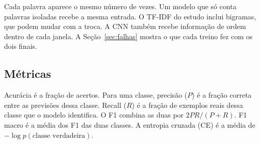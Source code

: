 Cada palavra aparece o mesmo número de vezes. Um modelo que só conta palavras
isoladas recebe a mesma entrada. O TF-IDF do estudo inclui bigramas, que podem
mudar com a troca. A CNN também recebe informação de ordem dentro de cada
janela. A Seção~\ref{sec:falhas} mostra o que cada treino fez com os dois finais.

\subsection{Métricas}
Acurácia é a fração de acertos. Para uma classe, precisão (\(P\)) é a fração
correta entre as previsões dessa classe. Recall (\(R\)) é a fração de exemplos
reais dessa classe que o modelo identifica. O F1 combina as duas por
\(2PR/(P+R)\). F1 macro é a média dos F1 das duas classes.
A entropia cruzada (CE) é a média de \(-\log p(\text{classe verdadeira})\).

\vfill
{}
